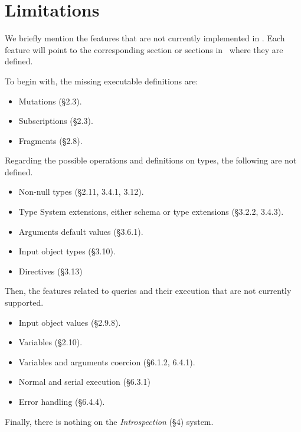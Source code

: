 \section{Limitations}\label{sec:limitations}

We briefly mention the features that are not currently implemented in \gcoql. 
Each feature will point to the corresponding section or sections in~\cite{gqlspec} where they are defined.

To begin with, the missing executable definitions are:
\begin{itemize}
	\item Mutations (\cf\S2.3).
	\item Subscriptions (\cf\S2.3).
	\item Fragments (\cf\S2.8).
\end{itemize}

Regarding the possible operations and definitions on types, the following are not defined.
\begin{itemize}
	\item Non-null types (\cf\S2.11, 3.4.1, 3.12). 
	\item Type System extensions, either schema or type extensions (\cf\S3.2.2, 3.4.3).
	\item Arguments default values (\cf\S3.6.1).
	\item Input object types (\cf\S3.10).
	\item Directives (\cf\S3.13) 
\end{itemize}

Then, the features related to queries and their execution that are not currently supported.
\begin{itemize}
	\item Input object values (\cf\S2.9.8).
	\item Variables (\cf\S2.10).
	\item Variables and arguments coercion (\cf\S6.1.2, 6.4.1).
	\item Normal and serial execution (\cf\S6.3.1)
	\item Error handling (\cf\S6.4.4). 
\end{itemize}

Finally, there is nothing on the \textit{Introspection} (\cf\S4) system. 


